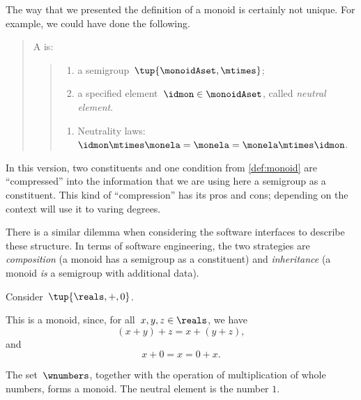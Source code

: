 \begin{remark}
  The way that we presented the definition of a monoid is certainly not unique. For example, we could have done the following.

  \begin{quote}
    A \emph{} is:
    \begin{quote}
      \constit
      \begin{enumerate}
        \item a semigroup~$\tup{\monoidAset, \mtimes}$;
        \item a specified element~$\idmon\in \monoidAset$, called \emph{neutral element}.
      \end{enumerate}
      \condit
      \begin{enumerate}
        \item Neutrality laws:~$\idmon\mtimes \monela= \monela= \monela \mtimes \idmon$.
      \end{enumerate}
    \end{quote}
  \end{quote}
  In this version, two constituents and one condition from \cref{def:monoid} are ``compressed'' into the information that we are using here a semigroup as a constituent. This kind of ``compression'' has its pros and cons; depending on the context will use it to varing degrees.

  There is a similar dilemma when considering the software interfaces to describe these structure.
  In terms of software engineering, the two strategies are \emph{composition} (a monoid has a semigroup as a constituent)
  and \emph{inheritance} (a monoid \emph{is} a semigroup with additional data).

\end{remark}



\begin{example}
  Consider~$\tup{\reals,+,0}$.

  This is a monoid, since, for all~$x,y, z \in \reals$, we have
  \begin{equation*}
  (x+y)
    +z=x+(y+z),
  \end{equation*}
  and
  \begin{equation*}
    x+0=x=0+x.
  \end{equation*}
\end{example}

\begin{example}
  The set~$\wnumbers$, together with the operation of multiplication of whole numbers, forms a monoid. The neutral element is the number $1$.
\end{example}

